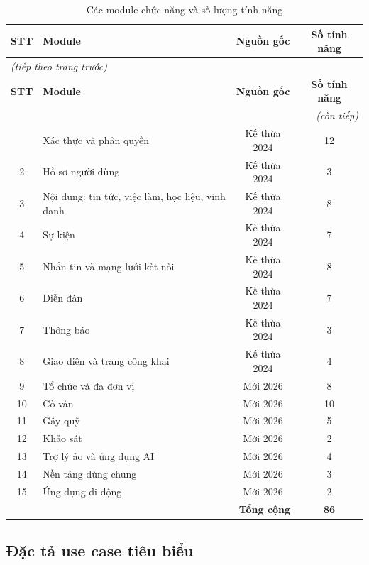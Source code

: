 \documentclass[12pt,a4paper,oneside]{report}
\begin{document}
\renewcommand{\arraystretch}{1.25}
{\small
\begin{longtable}{|c|>{\raggedright\arraybackslash}p{7.6cm}|c|c|}
\caption{Các module chức năng và số lượng tính năng}\label{tab:modules}\\
\hline \textbf{STT} & \textbf{Module} & \textbf{Nguồn gốc} & \textbf{Số tính năng} \\ \hline
\endfirsthead
\multicolumn{4}{l}{\itshape\small (tiếp theo trang trước)}\\[2pt]
\hline \textbf{STT} & \textbf{Module} & \textbf{Nguồn gốc} & \textbf{Số tính năng} \\ \hline
\endhead
\hline \multicolumn{4}{r}{\itshape\small (còn tiếp)}\\
\endfoot
\hline
\endlastfoot
1 & Xác thực và phân quyền & Kế thừa 2024 & 12 \\ \hline
2 & Hồ sơ người dùng & Kế thừa 2024 & 3 \\ \hline
3 & Nội dung: tin tức, việc làm, học liệu, vinh danh & Kế thừa 2024 & 8 \\ \hline
4 & Sự kiện & Kế thừa 2024 & 7 \\ \hline
5 & Nhắn tin và mạng lưới kết nối & Kế thừa 2024 & 8 \\ \hline
6 & Diễn đàn & Kế thừa 2024 & 7 \\ \hline
7 & Thông báo & Kế thừa 2024 & 3 \\ \hline
8 & Giao diện và trang công khai & Kế thừa 2024 & 4 \\ \hline
9 & Tổ chức và đa đơn vị & Mới 2026 & 8 \\ \hline
10 & Cố vấn & Mới 2026 & 10 \\ \hline
11 & Gây quỹ & Mới 2026 & 5 \\ \hline
12 & Khảo sát & Mới 2026 & 2 \\ \hline
13 & Trợ lý ảo và ứng dụng AI & Mới 2026 & 4 \\ \hline
14 & Nền tảng dùng chung & Mới 2026 & 3 \\ \hline
15 & Ứng dụng di động & Mới 2026 & 2 \\ \hline
\multicolumn{3}{|r|}{\textbf{Tổng cộng}} & \textbf{86} \\ \hline
\end{longtable}
}
\renewcommand{\arraystretch}{1}

\subsection{Đặc tả use case tiêu biểu}
\end{document}
